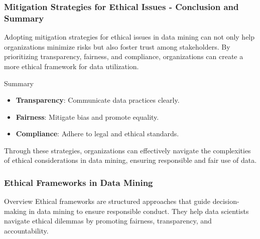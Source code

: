 \documentclass[aspectratio=169]{beamer}
\begin{document}
\begin{frame}[fragile]
    \frametitle{Mitigation Strategies for Ethical Issues - Conclusion and Summary}
    Adopting mitigation strategies for ethical issues in data mining can not only help organizations minimize risks but also foster trust among stakeholders. 
    By prioritizing transparency, fairness, and compliance, organizations can create a more ethical framework for data utilization.

    \begin{block}{Summary}
        \begin{itemize}
            \item \textbf{Transparency}: Communicate data practices clearly.
            \item \textbf{Fairness}: Mitigate bias and promote equality.
            \item \textbf{Compliance}: Adhere to legal and ethical standards.
        \end{itemize}
    \end{block}
    
    Through these strategies, organizations can effectively navigate the complexities of ethical considerations in data mining, ensuring responsible and fair use of data.
\end{frame}

\begin{frame}[fragile]
    \frametitle{Ethical Frameworks in Data Mining}
    
    \begin{block}{Overview}
        Ethical frameworks are structured approaches that guide decision-making in data mining to ensure responsible conduct. They help data scientists navigate ethical dilemmas by promoting fairness, transparency, and accountability.
    \end{block}
\end{frame}
\end{document}
